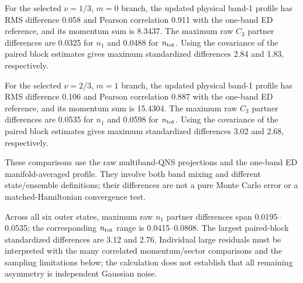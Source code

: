 For the selected $\nu=1/3$, $m=0$ branch, the updated physical band-1 profile has RMS difference 0.058 and Pearson correlation 0.911 with the one-band ED reference, and its momentum sum is 8.3437. The maximum raw $C_3$ partner differences are 0.0325 for $n_1$ and 0.0488 for $n_{\rm tot}$. Using the covariance of the paired block estimates gives maximum standardized differences 2.84 and 1.83, respectively.

For the selected $\nu=2/3$, $m=1$ branch, the updated physical band-1 profile has RMS difference 0.106 and Pearson correlation 0.887 with the one-band ED reference, and its momentum sum is 15.4304. The maximum raw $C_3$ partner differences are 0.0535 for $n_1$ and 0.0598 for $n_{\rm tot}$. Using the covariance of the paired block estimates gives maximum standardized differences 3.02 and 2.68, respectively.

These comparisons use the raw multiband-QNS projections and the one-band ED manifold-averaged profile. They involve both band mixing and different state/ensemble definitions; their differences are not a pure Monte Carlo error or a matched-Hamiltonian convergence test.

Across all six outer states, maximum raw $n_1$ partner differences span 0.0195--0.0535; the corresponding $n_{\rm tot}$ range is 0.0415--0.0808. The largest paired-block standardized differences are 3.12 and 2.76. Individual large residuals must be interpreted with the many correlated momentum/sector comparisons and the sampling limitations below; the calculation does not establish that all remaining asymmetry is independent Gaussian noise.

